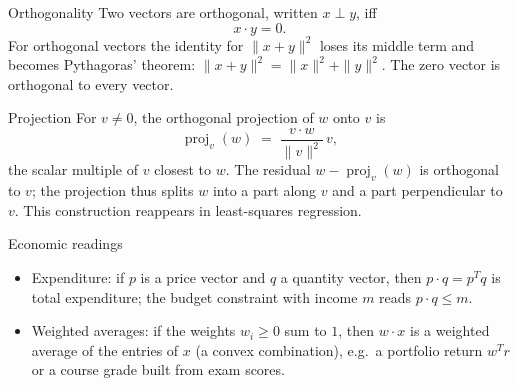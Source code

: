 \begin{rulebox}{Orthogonality}
Two vectors are orthogonal, written
$x \perp y$, iff
\[
x \cdot y = 0 .
\]
For orthogonal vectors the identity for $\|x + y\|^{2}$ loses its middle
term and becomes Pythagoras' theorem:
$\|x + y\|^{2} = \|x\|^{2} + \|y\|^{2}$. The zero vector is orthogonal to
every vector.
\end{rulebox}

\begin{rulebox}{Projection}
For $v \neq 0$, the orthogonal projection of $w$ onto $v$ is
\[
\operatorname{proj}_{v}(w) \;=\; \frac{v \cdot w}{\|v\|^{2}} \, v ,
\]
the scalar multiple of $v$ closest to $w$. The residual
$w - \operatorname{proj}_{v}(w)$ is orthogonal to $v$; the projection thus
splits $w$ into a part along $v$ and a part perpendicular to $v$. This
construction reappears in least-squares regression.
\end{rulebox}

\begin{rulebox}{Economic readings}
\begin{itemize}[leftmargin=1.6em,itemsep=0.3ex]
  \item Expenditure: if $p$ is a price vector and $q$ a quantity vector,
        then $p \cdot q = p^{T} q$ is total expenditure; the budget
        constraint with income $m$ reads $p \cdot q \le m$.
  \item Weighted averages: if the weights $w_{i} \ge 0$ sum to $1$, then
        $w \cdot x$ is a weighted average of the entries of $x$ (a convex
        combination), e.g.\ a portfolio return $w^{T} r$ or a course
        grade built from exam scores.
\end{itemize}
\end{rulebox}

